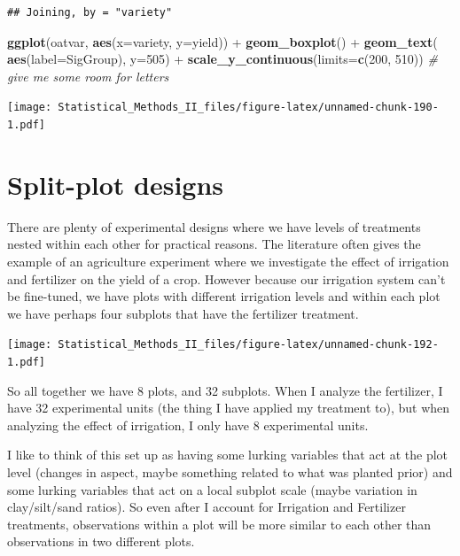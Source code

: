 \documentclass[]{book}
\newenvironment{Shaded}{\begin{snugshade}}{\end{snugshade}}
\newcommand{\KeywordTok}[1]{\textcolor[rgb]{0.13,0.29,0.53}{\textbf{{#1}}}}
\newcommand{\DataTypeTok}[1]{\textcolor[rgb]{0.13,0.29,0.53}{{#1}}}
\newcommand{\DecValTok}[1]{\textcolor[rgb]{0.00,0.00,0.81}{{#1}}}
\newcommand{\StringTok}[1]{\textcolor[rgb]{0.31,0.60,0.02}{{#1}}}
\newcommand{\CommentTok}[1]{\textcolor[rgb]{0.56,0.35,0.01}{\textit{{#1}}}}
\newcommand{\NormalTok}[1]{{#1}}
\theoremstyle{definition}
\theoremstyle{definition}
\theoremstyle{remark}
\begin{document}
\begin{verbatim}
## Joining, by = "variety"
\end{verbatim}

\begin{Shaded}
\begin{Highlighting}[]
\KeywordTok{ggplot}\NormalTok{(oatvar, }\KeywordTok{aes}\NormalTok{(}\DataTypeTok{x=}\NormalTok{variety, }\DataTypeTok{y=}\NormalTok{yield)) +}
\StringTok{  }\KeywordTok{geom_boxplot}\NormalTok{() +}
\StringTok{  }\KeywordTok{geom_text}\NormalTok{( }\KeywordTok{aes}\NormalTok{(}\DataTypeTok{label=}\NormalTok{SigGroup), }\DataTypeTok{y=}\DecValTok{505}\NormalTok{) +}
\StringTok{  }\KeywordTok{scale_y_continuous}\NormalTok{(}\DataTypeTok{limits=}\KeywordTok{c}\NormalTok{(}\DecValTok{200}\NormalTok{, }\DecValTok{510}\NormalTok{))  }\CommentTok{# give me some room for letters}
\end{Highlighting}
\end{Shaded}

\texttt{[image: Statistical\_Methods\_II\_files/figure-latex/unnamed-chunk-190-1.pdf]}

\section{Split-plot designs}\label{split-plot-designs}

There are plenty of experimental designs where we have levels of
treatments nested within each other for practical reasons. The
literature often gives the example of an agriculture experiment where we
investigate the effect of irrigation and fertilizer on the yield of a
crop. However because our irrigation system can't be fine-tuned, we have
plots with different irrigation levels and within each plot we have
perhaps four subplots that have the fertilizer treatment.

\texttt{[image: Statistical\_Methods\_II\_files/figure-latex/unnamed-chunk-192-1.pdf]}

So all together we have 8 plots, and 32 subplots. When I analyze the
fertilizer, I have 32 experimental units (the thing I have applied my
treatment to), but when analyzing the effect of irrigation, I only have
8 experimental units.

I like to think of this set up as having some lurking variables that act
at the plot level (changes in aspect, maybe something related to what
was planted prior) and some lurking variables that act on a local
subplot scale (maybe variation in clay/silt/sand ratios). So even after
I account for Irrigation and Fertilizer treatments, observations within
a plot will be more similar to each other than observations in two
different plots.
\end{document}
